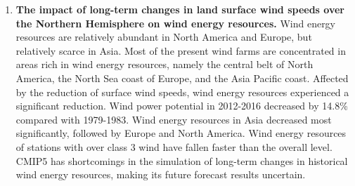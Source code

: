 \begin{enumerate}
\item  \textbf{The impact of long-term changes in land surface wind speeds over the Northern Hemisphere on wind energy resources.} Wind energy resources are relatively abundant in North America and Europe, but relatively scarce in Asia. Most of the present wind farms are concentrated in areas rich in wind energy resources, namely the central belt of North America, the North Sea coast of Europe, and the Asia Pacific coast. Affected by the reduction of surface wind speeds, wind energy resources experienced a significant reduction. Wind power potential in 2012-2016 decreased by 14.8\% compared with 1979-1983. Wind energy resources in Asia decreased most significantly, followed by Europe and North America. Wind energy resources of stations with over class 3 wind have fallen faster than the overall level. CMIP5 has shortcomings in the simulation of long-term changes in historical wind energy resources, making its future forecast results uncertain.

\end{enumerate}


